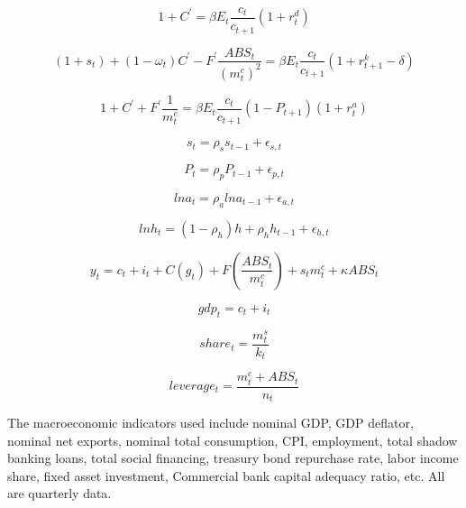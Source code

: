 \documentclass[10pt,math=newtx,citestyle=gb7714-2015,bibstyle=gb7714-2015]{elegantbook}
\begin{document}
	\begin{equation}\label{label}
		1+C^{'}=\beta E_t\frac{c_t}{c_{t+1}}(1+r_t^d)
	\end{equation}
	
	\begin{equation}\label{label}
		(1+s_t)+(1-\omega_t)C^{'}-F^{'}\frac{ABS_t}{(m_t^c)^2}=\beta E_t\frac{c_t}{c_{t+1}}(1+r_{t+1}^k-\delta)
	\end{equation}
	
	\begin{equation}\label{label}
		1+C^{'}+F^{'}\frac{1}{m_t^c}=\beta E_t\frac{c_t}{c_{t+1}}(1-P_{t+1})(1+r_t^a)
	\end{equation}
	
	\begin{equation}\label{label}
		s_t=\rho_ss_{t-1}+\epsilon_{s,t}
	\end{equation}
	
	\begin{equation}\label{label}
		P_t=\rho_pP_{t-1}+\epsilon_{p,t}
	\end{equation}
	
	\begin{equation}\label{label}
		lna_t=\rho_alna_{t-1}+\epsilon_{a,t}
	\end{equation}
	
	\begin{equation}\label{label}
		lnh_t=(1-\rho_h)h+\rho_hh_{t-1}+\epsilon_{h,t}
	\end{equation}
	
	\begin{equation}\label{label}
		y_t=c_t+i_t+C(g_t)+F(\frac{ABS_t}{m_t^c})+s_tm_t^c+\kappa ABS_t
	\end{equation}
	
	\begin{equation}\label{label}
		gdp_t=c_t+i_t
	\end{equation}
	
	\begin{equation}\label{label}
		share_t=\frac{m_t^s}{k_t}
	\end{equation}
	
	\begin{equation}\label{label}
		leverage_t=\frac{m_t^c+ABS_t}{n_t}
	\end{equation}
	
	The macroeconomic indicators used include nominal GDP, GDP deflator, nominal net exports, nominal total consumption, CPI, employment, total shadow banking loans, total social financing, treasury bond repurchase rate, labor income share, fixed asset investment, Commercial bank capital adequacy ratio, etc. All are quarterly data.
	
\end{document}

